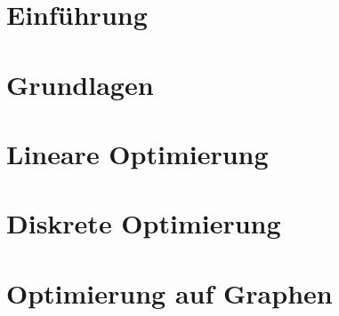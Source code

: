 \documentclass[ngerman, a4paper, 11pt]{report}
\begin{document}
	
	\tableofcontents
	\vfill
	{\footnotesize \doclicenseThis }
	
	\chapter{Einführung}
	\label{chapter_1_einfuehrung}
	
	
	
	
	\chapter{Grundlagen}
	\label{chapter_2_grundlagen}
	
	
	
	
	\chapter{Lineare Optimierung}
	\label{chapter_3_lineareOptimierung}
	
	
	
	
	
	
	
	\chapter{Diskrete Optimierung}
	\label{chapter_4_diskreteOptimierung}
	
	
	
	
	
	\chapter{Optimierung auf Graphen}
	\label{chapter_5_optimierungGraphen}
	
	
	
	
	
\end{document}
